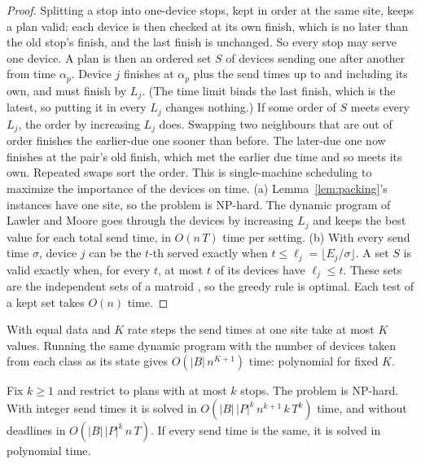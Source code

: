 \begin{proof}
Splitting a stop into one-device stops, kept in order at the same site,
keeps a plan valid: each device is then checked at its own finish, which is
no later than the old stop's finish, and the last finish is unchanged. So
every stop may serve one device. A plan is then an ordered set $S$ of
devices sending one after another from time $\alpha_p$. Device $j$ finishes
at $\alpha_p$ plus the send times up to and including its own, and must
finish by $L_j$. (The time limit binds the last finish, which is the
latest, so putting it in every $L_j$ changes nothing.) If some order of $S$
meets every $L_j$, the order by increasing $L_j$ does. Swapping two
neighbours that are out of order finishes the earlier-due one sooner than
before. The later-due one now finishes at the pair's old finish, which met
the earlier due time and so meets its own. Repeated swaps sort the
order. This is single-machine scheduling to maximize the importance of the
devices on time. (a) Lemma~\ref{lem:packing}'s instances have one site, so
the problem is NP-hard. The dynamic program of Lawler and Moore
\cite{LawlerMoore1969} goes through the devices by increasing $L_j$ and
keeps the best value for each total send time, in $O(n\,T)$ time per
setting. (b) With every send time $\sigma$, device $j$ can be the $t$-th
served exactly when $t\le\ell_j=\lfloor E_j/\sigma\rfloor$. A set $S$ is
valid exactly when, for every $t$, at most $t$ of its devices have
$\ell_j\le t$. These sets are the independent sets of a matroid
\cite[Section~16.5]{CLRS2009}, so the greedy rule is optimal. Each test of
a kept set takes $O(n)$ time.
\end{proof}

With equal data and $K$ rate steps the send times at one site take at most
$K$ values. Running the same dynamic program with the number of devices
taken from each class as its state gives $O(|B|\,n^{K+1})$ time:
polynomial for fixed $K$.

\begin{proposition}
\label{prop:k-stops}
Fix $k\ge1$ and restrict to plans with at most $k$ stops. The problem is
NP-hard. With integer send times it is solved in
$O(|B|\,|P|^k\,n^{k+1}\,k\,T^{k})$ time, and without deadlines in
$O(|B|\,|P|^k\,n\,T)$. If every send time is the same, it is solved in
polynomial time.
\end{proposition}

